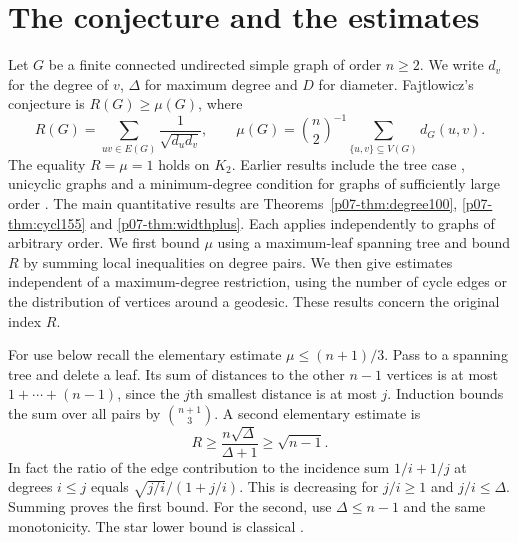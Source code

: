 \documentclass[11pt,a4paper]{article}
\begin{document}
\section{The conjecture and the estimates}
Let $G$ be a finite connected undirected simple graph of order $n\ge2$.
We write $d_v$ for the degree of $v$, $\Delta$ for maximum degree and $D$
for diameter. Fajtlowicz's conjecture \cite{p07-Faj} is $R(G)\ge\mu(G)$, where
\[
 R(G)=\sum_{uv\in E(G)}\frac1{\sqrt{d_ud_v}},
 \qquad \mu(G)=\binom n2^{-1}\sum_{\{u,v\}\subseteq V(G)}d_G(u,v).
\]
The equality $R=\mu=1$ holds on $K_2$. Earlier results include the tree
case \cite{p07-CPSMean}, unicyclic graphs \cite{p07-YL} and a minimum-degree
condition for graphs of sufficiently large order \cite{p07-Dal}. The main quantitative results are Theorems~\ref{p07-thm:degree100},
\ref{p07-thm:cycl155} and \ref{p07-thm:widthplus}. Each applies independently to
graphs of arbitrary order. We first
bound $\mu$ using a maximum-leaf spanning tree and bound $R$ by summing
local inequalities on degree pairs. We then give estimates independent
of a maximum-degree restriction, using the number of cycle edges or the
distribution of vertices around a geodesic. These results concern
the original index $R$.

For use below recall the elementary estimate $\mu\le(n+1)/3$. Pass to
a spanning tree and delete a leaf. Its sum of distances to the other
$n-1$ vertices is at most $1+\cdots+(n-1)$, since the $j$th smallest
distance is at most $j$. Induction bounds the sum over all pairs by
$\binom{n+1}{3}$. A second elementary estimate is
\begin{equation}\label{p07-eq:basic}
 R\ge \frac{n\sqrt{\Delta}}{\Delta+1}\ge\sqrt{n-1}.
\end{equation}
In fact the ratio of the edge contribution to the incidence sum
$1/i+1/j$ at degrees $i\le j$ equals $\sqrt{j/i}/(1+j/i)$. This is
decreasing for $j/i\ge1$ and $j/i\le\Delta$. Summing proves the
first bound. For the second, use $\Delta\le n-1$ and the same
monotonicity. The star lower bound is classical \cite{p07-BE}.
\end{document}
